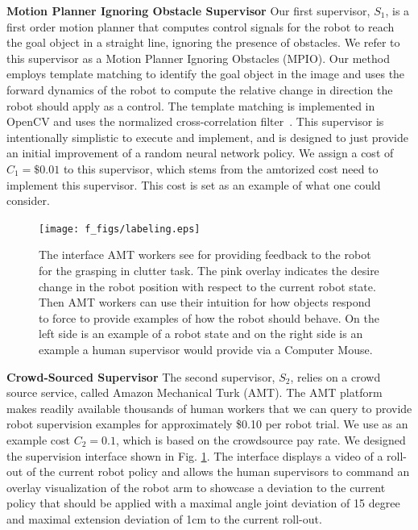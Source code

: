 \documentclass[10pt, conference]{ieeeconf}      %
\begin{document}
\noindent \textbf{Motion Planner Ignoring Obstacle Supervisor} Our first supervisor, $S_1$, is a first order motion planner that computes
control signals for the robot to reach the goal object in a straight line, ignoring the presence of obstacles. We refer to this supervisor as a Motion Planner  Ignoring Obstacles (MPIO). Our
method employs template matching to identify the goal object in the image and uses the forward dynamics of the robot to
compute the relative change in direction the robot should apply as a control. The template matching is implemented in
OpenCV and uses the normalized cross-correlation filter~\cite{opencv_library}. This supervisor is intentionally
simplistic to execute and implement, and is designed to just provide an initial improvement of a random neural network policy.
We assign a cost of $C_1 = \$0.01$ to this supervisor, which stems from the amtorized cost need to implement this supervisor. This cost is set as an example of what one could consider. 
\begin{figure}[t]
\centering

\texttt{[image: f\_figs/labeling.eps]}

\caption{\footnotesize  The interface AMT workers see for providing feedback to the robot for the grasping in clutter task. The pink overlay indicates the desire change in the robot position with respect to the current robot state. Then AMT workers can use their intuition for how objects respond to force to provide examples of how the robot should behave. On the left side is an example of a robot state and on the right side is an example a human supervisor would provide via a Computer Mouse.}
\vspace*{-10pt}
\label{fig:overlays}
\end{figure}

\noindent \textbf{Crowd-Sourced Supervisor} The second supervisor, $S_2$, relies on a crowd source service, called Amazon
Mechanical Turk (AMT). The AMT platform makes readily available thousands of human workers that we can query to provide robot
supervision examples for approximately \$0.10 per robot trial. We use as an example cost $C_2 = 0.1$, which is based on the crowdsource pay rate. 
We designed the supervision interface shown in Fig. \ref{fig:overlays}. The interface displays a video of a roll-out of
the current robot policy and allows the human supervisors to command an overlay visualization of the robot arm to
showcase a deviation to the current policy that should be applied with a maximal angle joint deviation of 15 degree and maximal extension deviation of 1cm  to
the current roll-out.
\end{document}
